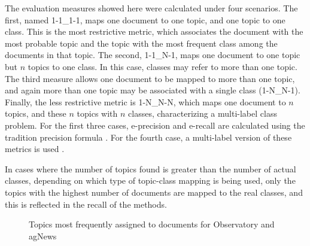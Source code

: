 The evaluation measures showed here were calculated under four scenarios. The first, named 1-1\_1-1, maps one document to one topic, and one topic to one class. This is the most restrictive metric, which associates the document with the most probable topic and the topic with the most frequent class among the documents in that topic. The second, 1-1\_N-1, maps one document to one topic but $n$ topics to one class. In this case, classes may refer to more than one topic. The third measure allows one document to be mapped to more than one topic, and again more than one topic may be associated with a single class (1-N\_N-1). Finally, the less restrictive metric is 1-N\_N-N, which maps one document to $n$ topics, and these $n$ topics with $n$ classes, characterizing a multi-label class problem.
For the first three cases, e-precision and e-recall are calculated using the tradition precision formula \cite{witten:2005}. For the fourth case, a multi-label version of these metrics is used \cite{tsoumakas2007multi}. 

In cases where the number of topics found is greater than the number of actual classes, depending on which type of topic-class mapping is being used, only the topics with the highest number of documents are mapped to the real classes, and this is reflected in the recall of the methods. 
\begin{figure}[!t]
\centering
	\caption{Topics most frequently assigned to documents %
	for Observatory and agNews}
	\label{fig:histograms}
\end{figure}

